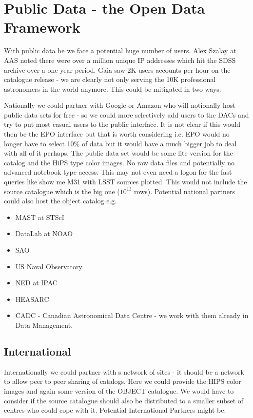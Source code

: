 

\section{Public Data - the Open Data Framework}\label{sec:public}


With public data be we face a potential huge number of users.
Alex Szalay at AAS noted there were over a million unique IP addresses which hit the SDSS archive over a one year period.  Gaia saw 2K users accounts per hour on the catalogue release - we are clearly not only serving the 10K professional astronomers in the world anymore.
This could be mitigated in two ways.


Nationally we could partner with Google or Amazon who will notionally host public data sets for free - so we could more selectively add users to the DACs and try to put most casual users to the public interface. It is not clear if this would then be the EPO interface but that is worth considering i.e. EPO would no longer have to select 10\% of data but it would have a much bigger job to deal with all of it perhaps.
The public data set would be some lite version for the catalog   and the HiPS type color images. No raw data files and potentially no advanced notebook type access. This may not even need a logon for the fast queries like show me M31 with LSST sources plotted. This would not include the source catalogue which is the big one ($10^{13}$ rows).
Potential national partners  could also host the object catalog e.g.

\begin{itemize}
 \item MAST at STScI
 \item DataLab at NOAO
 \item SAO
 \item US Naval Observatory
 \item NED at IPAC
 \item HEASARC
 \item CADC - Canadian Astronomical Data Centre - we work with them already in Data Management.
\end{itemize}

\subsection {International}
Internationally we could partner with s network of sites - it should be a network to allow peer to peer sharing of catalogs. Here we could provide the HIPS color images and again some version of the OBJECT catalogue. We would have to consider if the source catalogue should also be distributed to a smaller subset of centres who could cope with it.
Potential International Partners might be:

